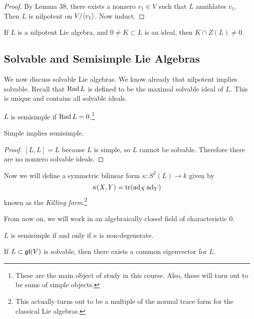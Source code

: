 \documentclass[twoside, 10pt]{article}
\begin{document}
    \begin{proof} By Lemma 38, there exists a nonzero $v_1 \in V$ such that $L$
    annihlates $v_1$. Then $L$ is nilpotent on $V / \langle v_1\rangle$. Now induct.
\end{proof}

    \begin{cor} If $L$ is a nilpotent Lie algebra, and $0 \neq K \subset L$ is
    an ideal, then $K \cap Z(L) \neq 0$.  \end{cor}

    \subsection{Solvable and Semisimple Lie Algebras}%
    \label{sub:solvable_and_semisimple_lie_algebras}
    
    
    We now discuss solvable Lie algebras. We know already that nilpotent
    implies solvable. Recall that $\operatorname{Rad} L$ is defined to be the maximal
    solvable ideal of $L$. This is unique and contains all solvable ideals.

    \begin{defn} $L$ is semisimple if $\operatorname{Rad} L = 0$.\footnote{These are the main
    object of study in this course. Also, these will turn out to be sums of
    simple objects.} \end{defn}

    \begin{prop} Simple implies semisimple.  \end{prop}

    \begin{proof} $[L,L] = L$ because $L$ is simple, so $L$ cannot be solvable.
    Therefore there are no nonzero solvable ideals.  \end{proof}
    
    Now we will define a symmetric bilinear form $\kappa: S^2(L) \to k$ given
    by \[\kappa(X,Y) = \operatorname{tr}(\operatorname{ad}_X \operatorname{ad}_Y)\] known as the \textit{Killing
    form}.\footnote{This actually turns out to be a multiple of the normal
trace form for the classical Lie algebras.}

    From now on, we will work in an algebraically closed field of
    characteristic $0$.  \begin{thm}[Killing] $L$ is semisimple if and only if
    $\kappa$ is non-degenerate.  \end{thm}

    \begin{thm}[Lie] If $L \subset \mathfrak{gl}(V)$ is solvable, then there exists a
    common eigenvector for $L$.  \end{thm}
    
\end{document}
